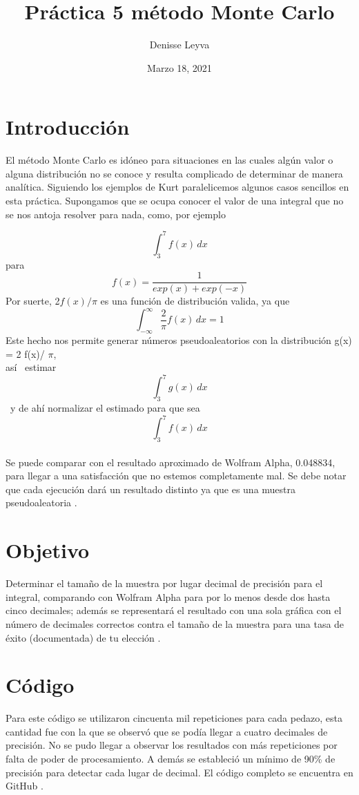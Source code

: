 \documentclass{article}
\title{Práctica 5 método Monte Carlo}
\author{Denisse Leyva}
\date{Marzo 18, 2021}
\begin{document}
\maketitle




\section{Introducción}
El método Monte Carlo es idóneo para situaciones en las cuales algún valor o alguna distribución no se conoce y resulta complicado de determinar de manera analítica. Siguiendo los ejemplos de Kurt \cite{Will_Kurt} paralelicemos algunos casos sencillos en esta práctica.
Supongamos que se ocupa conocer el valor de una integral que no se nos antoja resolver para nada, como, por ejemplo

\[ \int_{3}^{7} f(x) \,dx \] para
\[f(x) = \frac {1}{exp(x) + exp(-x)}\]
Por suerte, 2$f(x)/ \pi$ es una función de distribución valida, ya que
\[ \int_{-\infty}^{\infty}\frac{2}{\pi} f(x) \,dx = 1\]
Este hecho nos permite generar números pseudoaleatorios con la distribución 	g(x) = 2 f(x)/ $\pi$, \\ así \ estimar \[ \int_{3}^{7} g(x) \,dx \]
\ y de ahí normalizar el estimado para que sea \[\int_{3}^{7} f(x) \,dx\] \\
Se puede comparar con el resultado aproximado de Wolfram Alpha, 0.048834, para llegar a una satisfacción que no estemos completamente mal. Se debe notar que cada ejecución dará un resultado distinto ya que es una muestra pseudoaleatoria \cite{Satu_Elisa_Schaeffer}.


\section{Objetivo}
Determinar el tamaño de la muestra por lugar decimal de precisión para el integral, comparando con Wolfram Alpha para por lo menos desde dos hasta cinco decimales; además se representará el resultado con una sola gráfica con el número de decimales correctos contra el tamaño de la muestra para una tasa de éxito (documentada) de tu elección \cite{Satu_Elisa_Schaeffer}.
\newpage

\section{Código}

Para este código se utilizaron cincuenta mil repeticiones para cada pedazo, esta cantidad fue con la que se observó que se podía llegar a cuatro decimales de precisión. No se pudo llegar a observar los resultados con más repeticiones por falta de poder de procesamiento. A demás se estableció un mínimo de 90\% de precisión para detectar cada lugar de decimal.  El código completo se encuentra en GitHub \cite{Denisse_Leyva}.
\end{document}
